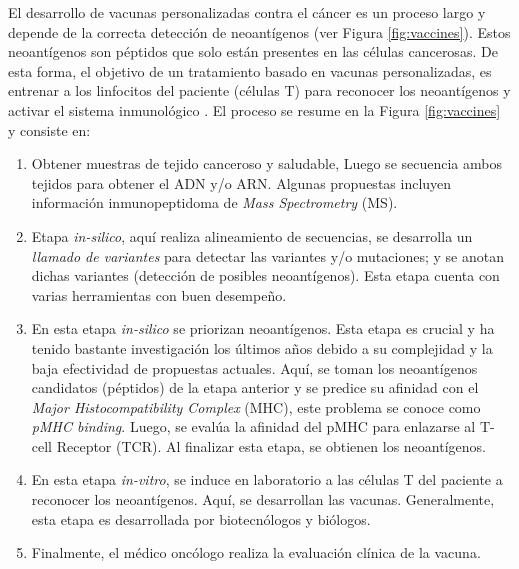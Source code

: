 \documentclass[a4paper,11pt]{article}
\begin{document}
	
	El desarrollo de vacunas personalizadas contra el cáncer es un proceso largo y depende de la correcta detección de neoantígenos (ver Figura \ref{fig:vaccines}). Estos neoantígenos son péptidos que solo están presentes en las células cancerosas. De esta forma, el objetivo de un tratamiento basado en vacunas personalizadas, es entrenar a los linfocitos del paciente (células T) para reconocer los neoantígenos y activar el sistema inmunológico \cite{de2020neoantigen, peng2019neoantigen}. El proceso se resume en la Figura \ref{fig:vaccines} y consiste en: 
	
	
	
	
	\begin{enumerate}
		\item Obtener muestras de tejido canceroso y saludable, Luego se secuencia ambos tejidos para obtener el ADN y/o ARN. Algunas propuestas incluyen información inmunopeptidoma de \textit{Mass Spectrometry} (MS).
		\item Etapa \textit{in-silico}, aquí realiza alineamiento de secuencias, se desarrolla un \textit{llamado de variantes} para detectar las variantes y/o mutaciones; y se anotan dichas variantes (detección de posibles neoantígenos). Esta etapa cuenta con varias herramientas con buen desempeño.
		\item En esta etapa \textit{in-silico} se priorizan neoantígenos. Esta etapa es crucial y ha tenido bastante investigación los últimos años debido a su complejidad y la baja efectividad de propuestas actuales. Aquí, se toman los neoantígenos candidatos (péptidos) de la etapa anterior y se predice su afinidad con el \textit{Major Histocompatibility Complex} (MHC), este problema se conoce como \textit{pMHC binding}. Luego, se  evalúa la afinidad del pMHC para enlazarse al T-cell Receptor (TCR). Al finalizar esta etapa, se obtienen los neoantígenos.
		\item En esta etapa \textit{in-vitro}, se induce en laboratorio  a las células T del paciente a reconocer los neoantígenos. Aquí, se desarrollan las vacunas. Generalmente, esta etapa es desarrollada por biotecnólogos y biólogos.
		\item Finalmente, el médico oncólogo realiza la evaluación clínica de la vacuna.
	\end{enumerate}
	
	
	
	
	
	
	
\end{document}
